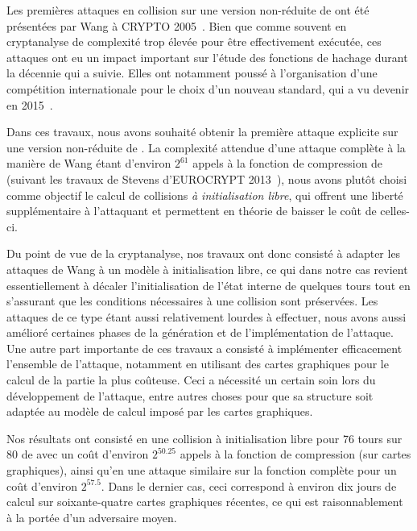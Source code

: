 \medskip

Les premières attaques en collision sur une version non-réduite de \shaone ont été présentées par Wang \etal à CRYPTO 2005~\cite{DBLP:conf/crypto/WangYY05a}. Bien que
comme souvent en cryptanalyse de complexité
trop élevée pour être effectivement exécutée, ces attaques ont eu un impact important sur l'étude des fonctions de hachage durant la décennie qui a suivie. Elles ont notamment poussé à l'organisation
d'une compétition internationale pour le choix d'un nouveau standard, qui a vu \keccak devenir \shathree en 2015~\cite{Nist-SHA3}.

Dans ces travaux, nous avons souhaité obtenir la première attaque explicite sur une version non-réduite de \shaone. La complexité attendue d'une attaque complète à la
manière de Wang étant d'environ $2^{61}$ appels
à la fonction de compression de \shaone (suivant les travaux de Stevens d'EUROCRYPT 2013~\cite{DBLP:conf/eurocrypt/Stevens13}), nous avons plutôt choisi comme objectif le calcul de collisions
\emph{à initialisation libre}, qui offrent une liberté supplémentaire à l'attaquant et permettent en théorie de baisser le coût de celles-ci.

Du point de vue de la cryptanalyse, nos travaux ont
donc consisté à adapter les attaques de Wang \etal à un modèle à initialisation libre, ce qui dans notre cas revient essentiellement à décaler l'initialisation de l'état interne \shaone de quelques
tours tout en s'assurant que les conditions nécessaires à une collision sont préservées. Les attaques de ce type étant aussi relativement lourdes à effectuer, nous avons aussi amélioré certaines
phases de la génération et de l'implémentation de l'attaque.
Une autre part importante de ces travaux a consisté à implémenter efficacement l'ensemble de l'attaque, notamment en utilisant des cartes graphiques pour le calcul de la partie la plus coûteuse.
Ceci a nécessité un certain soin lors du développement de l'attaque, entre autres choses pour que sa structure soit adaptée au modèle de calcul imposé par les cartes graphiques.

Nos résultats ont consisté en une collision à initialisation libre pour 76 tours sur 80 de \shaone avec un coût d'environ $2^{50.25}$ appels à la fonction de compression (sur cartes graphiques),
ainsi qu'en une attaque similaire sur la fonction complète pour un coût d'environ $2^{57.5}$. Dans le dernier cas, ceci correspond à environ dix jours de calcul sur soixante-quatre cartes
graphiques récentes, ce qui est raisonnablement à la portée d'un adversaire moyen.


